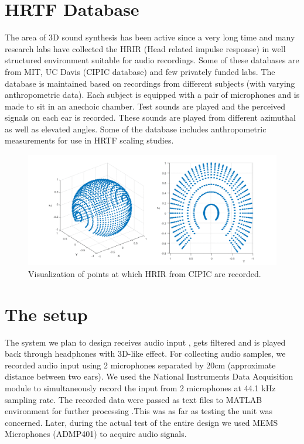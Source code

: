 \documentclass[BTech]{nitkdiss}
\begin{document}
\section{HRTF Database}
The area of 3D sound synthesis has been active since a very long time and many research labs have collected the HRIR (Head related impulse response) in well structured environment suitable for audio recordings. Some of these databases are from MIT, UC Davis (CIPIC database) and few privately funded labs. \newline
The database is maintained based on recordings from different subjects (with varying anthropometric data). Each subject is equipped with a pair of microphones and is made to sit in an anechoic chamber. Test sounds are played and the perceived signals on each ear is recorded. These sounds are played from different azimuthal as well as elevated angles. Some of the database includes anthropometric measurements for use in HRTF scaling studies.
\begin{figure}
\includegraphics[width = \textwidth]{data_points}
\caption{Visualization of points at which HRIR from CIPIC are recorded.}
\end{figure}
\section{The setup}
The system we plan to design receives audio input , gets filtered and is played back through headphones with 3D-like effect. \newline
For collecting audio samples, we recorded audio input using 2 microphones separated by 20cm (approximate distance between two ears). We used the National Instruments Data Acquisition module to simultaneously record the input from 2 microphones at 44.1 kHz sampling rate. The recorded data were passed as text files to MATLAB environment for further processing .This was as far as testing the unit was concerned. Later, during the actual test of the entire design we used MEMS Microphones (ADMP401) to acquire audio signals. 
\end{document}
